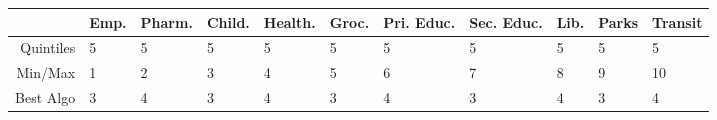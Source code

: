 \documentclass[11pt, a4paper]{article}
\begin{document}
\pagestyle{empty}




\begin{table}[ht]
\centering
\begin{tabular}{rllllllllll}
  \hline
 & Emp. & Pharm. & Child. & Health. & Groc. & Pri. Educ. & Sec. Educ. & Lib. & Parks & Transit \\ 
  \hline
Quintiles & 5 & 5 & 5 & 5 & 5 & 5 & 5 & 5 & 5 & 5 \\ 
  Min/Max &  1 &  2 &  3 &  4 &  5 &  6 &  7 &  8 &  9 & 10 \\ 
  Best Algo & 3 & 4 & 3 & 4 & 3 & 4 & 3 & 4 & 3 & 4 \\ 
   \hline
\end{tabular}
\end{table}
\end{document}
